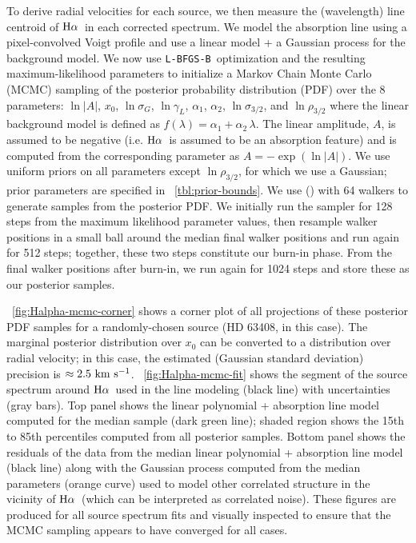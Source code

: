 \documentclass[modern, letterpaper]{aastex61}
\newcommand{\lbfgsb}{\texttt{L-BFGS-B}}
\newcommand{\Ha}{\ensuremath{{\rm H}\alpha}}
\begin{document}
To derive radial velocities for each source, we then measure the (wavelength)
line centroid of \Ha\ in each corrected spectrum.
We model the absorption line using a pixel-convolved Voigt profile and use a
linear model + a Gaussian process for the background model.
We now use \lbfgsb\ optimization and the resulting maximum-likelihood parameters
to initialize a Markov Chain Monte Carlo (MCMC) sampling of the posterior
probability distribution (PDF) over the 8 parameters: $\ln |A|$, $x_0$,
$\ln\sigma_G$, $\ln\gamma_L$, $\alpha_1$, $\alpha_2$, $\ln\sigma_{3/2}$, and
$\ln\rho_{3/2}$ where the linear background model is defined as $f(\lambda) =
\alpha_1 + \alpha_2\,\lambda$.
The linear amplitude, $A$, is assumed to be negative (i.e. \Ha\ is assumed to be
an absorption feature) and is computed from the corresponding parameter as $A =
-\exp(\ln |A|)$.
We use uniform priors on all parameters except $\ln\rho_{3/2}$, for which we use
a Gaussian; prior parameters are specified in \tablename~\ref{tbl:prior-bounds}.
We use  (\citealt{Foreman-Mackey:2013}) with 64 walkers to
generate samples from the posterior PDF.
We initially run the sampler for 128 steps from the maximum likelihood parameter
values, then resample walker positions in a small ball around the median final
walker positions and run again for 512 steps; together, these two steps
constitute our burn-in phase.
From the final walker positions after burn-in, we run again for 1024 steps and
store these as our posterior samples.

\figurename~\ref{fig:Halpha-mcmc-corner} shows a corner plot of all projections
of these posterior PDF samples for a randomly-chosen source (HD 63408, in this
case).
The marginal posterior distribution over $x_0$ can be converted to a
distribution over radial velocity; in this case, the estimated (Gaussian
standard deviation) precision is $\approx 2.5~\mathrm{km}~\mathrm{s}^{-1}$.
\figurename~\ref{fig:Halpha-mcmc-fit} shows the segment of the source spectrum
around \Ha\ used in the line modeling (black line) with uncertainties (gray
bars).
Top panel shows the linear polynomial + absorption line model computed for the
median sample (dark green line); shaded region shows the 15th to 85th
percentiles computed from all posterior samples.
Bottom panel shows the residuals of the data from the median linear polynomial +
absorption line model (black line) along with the Gaussian process computed from
the median parameters (orange curve) used to model other correlated structure in
the vicinity of \Ha\ (which can be interpreted as correlated noise).
These figures are produced for all source spectrum fits and visually inspected
to ensure that the MCMC sampling appears to have converged for all cases.
\end{document}
